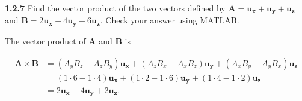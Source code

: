 \documentclass{article}
\begin{document}
\textbf{1.2.7} Find the vector product of the two vectors defined by $\mathbf{A} = \mathbf{u_x} + \mathbf{u_y} +
	\mathbf{u_z}$ and $\mathbf{B} = 2\mathbf{u_x} + 4\mathbf{u_y} + 6\mathbf{u_z}$. Check your answer using MATLAB.\@

\vspace{24pt}

The vector product of $\mathbf{A}$ and $\mathbf{B}$ is

\begin{equation*}
	\begin{split}
		\mathbf{A} \times \mathbf{B} & = (A_y B_z - A_z B_y)\mathbf{u_x} + (A_z B_x - A_x B_z)\mathbf{u_y} + (A_x B_y - A_y B_x)\mathbf{u_z} \\
		& = (1 \cdot 6 - 1 \cdot 4)\mathbf{u_x} + (1 \cdot 2 - 1 \cdot 6)\mathbf{u_y} + (1 \cdot 4 - 1 \cdot 2)\mathbf{u_z} \\
		& = 2\mathbf{u_x} - 4\mathbf{u_y} + 2\mathbf{u_z}.
	\end{split}
\end{equation*}
\end{document}
